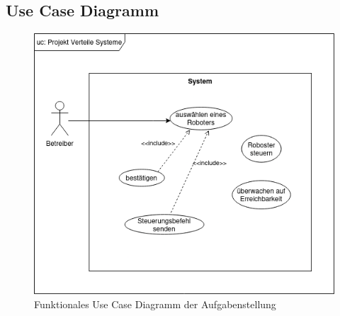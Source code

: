 \subsection*{Use Case Diagramm} %

\begin{figure}[h]
	\centering
	\includegraphics[scale=.5]{diagrams/use_case.png}
	\caption{Funktionales Use Case Diagramm der Aufgabenstellung}
	\label{fig:meine-grafik}
\end{figure}
